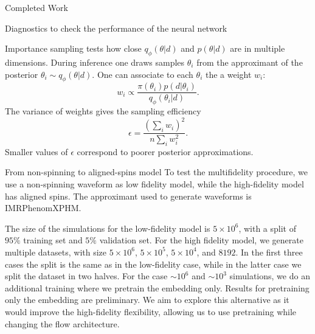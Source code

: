 \documentclass[a4paper, 12pt, twoside, openright, titlepage]{book}
\begin{document}
\begin{chapter}{Completed Work}
\begin{section}{Diagnostics to check the performance of the neural network}

Importance sampling tests how close $q_{\phi}(\theta|d)$ and $p(\theta|d)$ are in multiple dimensions.
During inference one draws samples $\theta_{i}$ from the approximant of the posterior $\theta_{i}\sim q_{\phi}(\theta|d)$.
One can associate to each $\theta_{i}$ the a weight $w_{i}$:
\begin{equation}
w_{i} \propto \frac{\pi(\theta_{i})p(d|\theta_{i})}{q_{\phi}(\theta_{i}|d)}.
\end{equation}
The variance of weights gives the sampling efficiency
\begin{equation}
\epsilon = \frac{\left(\sum_{i}w_{i}\right)^{2}}{n\sum_{i}w_{i}^{2}}.
\end{equation}
Smaller values of $\epsilon$ correspond to poorer posterior approximations.


\end{section}


\begin{section}{From non-spinning to aligned-spins model}
To test the multifidelity procedure, we use a non-spinning waveform as low fidelity model, while the high-fidelity model has aligned spins.
The approximant used to generate waveforms is IMRPhenomXPHM.

The size of the simulations for the low-fidelity model is $5\times10^6$, with a split of $95\%$ training set and $5\%$ validation set. For the high fidelity model, we generate multiple datasets, with size $5\times10^6$, $5\times10^5$, $5\times10^4$, and $8192$. In the first three cases the split is the same as in the low-fidelity case, while in the latter case we split the dataset in two halves.
For the case $\sim10^{6}$ and $\sim10^{3}$ simulations, we do an additional training where we pretrain the embedding only.
Results for pretraining only the embedding are preliminary.
We aim to explore this alternative as it would improve the high-fidelity flexibility, allowing us to use pretraining while changing the flow architecture.


\end{section}
\end{chapter}
\end{document}
